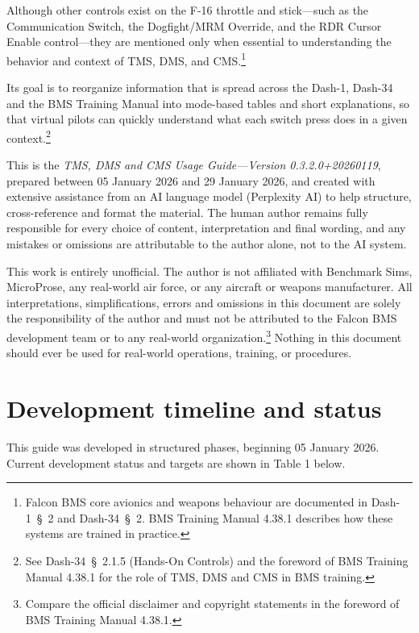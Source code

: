 \documentclass[11pt, a4paper, twoside]{report}
\providecommand{\dashref}[1]{Dash-34~\S~#1}
\providecommand{\dashone}[1]{Dash-1~\S~#1}
\providecommand{\trnman}{BMS Training Manual 4.38.1}
\newcommand{\docversion}{0.3.2.0}
\newcommand{\docbuild}{20260119}
\newcommand{\docstartdate}{05 January 2026}
\newcommand{\docenddate}{29 January 2026}
\newcommand{\fulldocversion}{\docversion+\docbuild}
\begin{document}
Although other controls exist on the F-16 throttle and stick---such as the Communication Switch, the Dogfight/MRM Override, and the RDR Cursor Enable control---they are mentioned only when essential to understanding the behavior and context of TMS, DMS, and CMS.\footnote{Falcon BMS core avionics and weapons behaviour are documented in \dashone{2} and \dashref{2}. \trnman{} describes how these systems are trained in practice.}

Its goal is to reorganize information that is spread across the Dash-1, Dash-34 and the BMS Training Manual into mode-based tables and short explanations, so that virtual pilots can quickly understand what each switch press does in a given context.\footnote{See \dashref{2.1.5} (Hands-On Controls) and the foreword of \trnman{} for the role of TMS, DMS and CMS in BMS training.}

This is the \emph{TMS, DMS and CMS Usage Guide---Version \fulldocversion}, prepared between \docstartdate{} and \docenddate{}, and created with extensive assistance from an AI language model (Perplexity AI) to help structure, cross-reference and format the material. The human author remains fully responsible for every choice of content, interpretation and final wording, and any mistakes or omissions are attributable to the author alone, not to the AI system.

This work is entirely unofficial. The author is not affiliated with Benchmark Sims, MicroProse, any real-world air force, or any aircraft or weapons manufacturer. All interpretations, simplifications, errors and omissions in this document are solely the responsibility of the author and must not be attributed to the Falcon BMS development team or to any real-world organization.\footnote{Compare the official disclaimer and copyright statements in the foreword of \trnman{}.} Nothing in this document should ever be used for real-world operations, training, or procedures.

\section{Development timeline and status}
\label{sec:C1-S1}

This guide was developed in structured phases, beginning \docstartdate{}. Current development status and targets are shown in Table 1 below.
\end{document}
